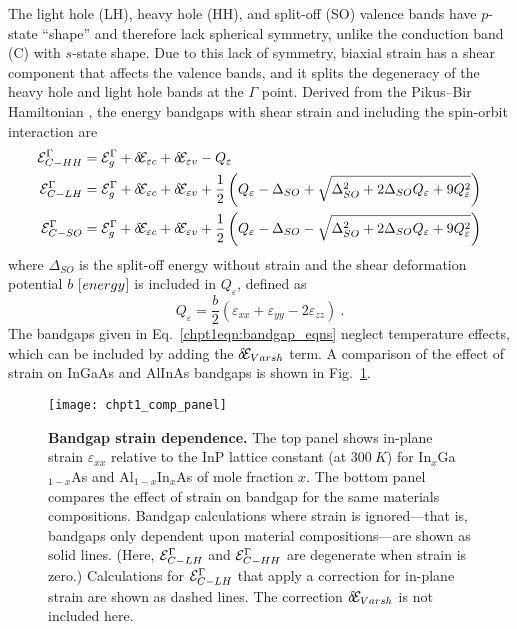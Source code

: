 \documentclass[12pt]{report}
\begin{document}
{The light hole (LH), heavy hole (HH), and split-off (SO) valence bands have \mbox{$p$-state} ``shape'' and therefore lack spherical symmetry, unlike the conduction band (C) with \mbox{$s$-state} shape.  Due to this lack of symmetry, biaxial strain has a shear component that affects the valence bands, and it splits the degeneracy of the heavy hole and light hole bands at the $\Gamma$ point.  Derived from the Pikus--Bir Hamiltonian \cite{Pikus-Bir}, the energy bandgaps with shear strain and including the spin-orbit interaction are
\begin{subequations}
\begin{align}
\label{chpt1eqn:bandgap_eqns}
\EE_{C-{HH}}^\Gamma &= \EE_g^\Gamma+\delta\!\EE_{\varepsilon c}+\delta\!\EE_{\varepsilon v}-Q_\varepsilon\\
\EE_{C-{LH}}^\Gamma &= \EE_g^\Gamma+\delta\!\EE_{\varepsilon c}+\delta\!\EE_{\varepsilon v} + \frac{1}{2} \left(Q_\varepsilon-\Delta_{{SO}}+\sqrt{\Delta_{{SO}}^2+2 \Delta_{{SO}} Q_\varepsilon +9 Q_\varepsilon^2}\right)\\
\EE_{C-{SO}}^\Gamma &= \EE_g^\Gamma+\delta\!\EE_{\varepsilon c}+\delta\!\EE_{\varepsilon v} + \frac{1}{2} \left(Q_\varepsilon-\Delta_{{SO}}-\sqrt{\Delta_{{SO}}^2+2 \Delta_{{SO}} Q_\varepsilon +9 Q_\varepsilon^2}\right)
\end{align}
\end{subequations}
where $\Delta_{{SO}}$ is the split-off energy without strain and the shear deformation potential $b$ [${\footnotesize{energy}}$] is included in $Q_\varepsilon$, defined as
\begin{equation}
Q_\varepsilon = \frac{b}{2} \left( \varepsilon_{xx}+\varepsilon_{yy}-2\varepsilon_{zz} \right) {~.}
\end{equation}
The bandgaps given in Eq.~\eqref{chpt1eqn:bandgap_eqns} neglect temperature effects, which can be included by adding the $\delta\!\EE_{Varsh}$ term.  A comparison of the effect of strain on InGaAs and AlInAs bandgaps is shown in Fig.~\ref{chpt1:strain_effect}.

\begin{figure}[tp]
\centering
\texttt{[image: chpt1\_comp\_panel]}
\caption[Bandgap strain dependence]{{\textbf{Bandgap strain dependence.}}  The top panel shows in-plane strain $\varepsilon_{xx}$ relative to the InP lattice constant (at $300~{K}$) for In$_x$Ga$_{1-x}$As and Al$_{1-x}$In$_{x}$As of mole fraction $x$.  The bottom panel compares the effect of strain on bandgap for the same materials compositions.  Bandgap calculations where strain is ignored---that is, bandgaps only dependent upon material compositions---are shown as solid lines.  (Here, $\EE_{C-{LH}}^\Gamma$ and $\EE_{C-{HH}}^\Gamma$ are degenerate when strain is zero.)  Calculations for $\EE_{C-{LH}}^\Gamma$ that apply a correction for in-plane strain are shown as dashed lines.  The correction $\delta\!\EE_{{Varsh}}$ is not included here.}
\label{chpt1:strain_effect}
\end{figure}


}
\end{document}
